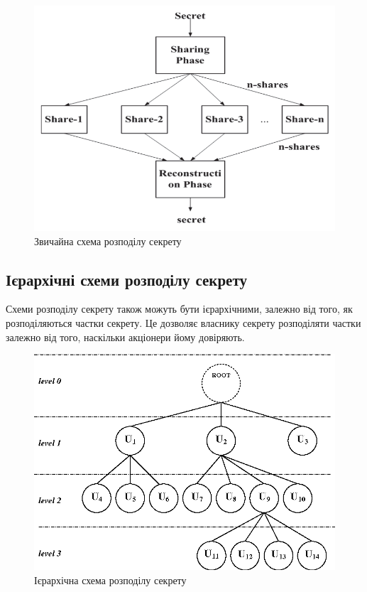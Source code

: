 \begin{figure}[ht]
        \centering
        \includegraphics[scale=0.37]{IMAGES/SSscheme.png}
        \caption{Звичайна схема розподілу секрету}
        \label{fig_SSscheme}
\end{figure}
\vspace{-1cm}

\subsection{Ієрархічні схеми розподілу секрету}
Схеми розподілу секрету також можуть бути ієрархічними, залежно від того, як розподіляються частки секрету. Це дозволяє власнику секрету розподіляти частки залежно від того, наскільки акціонери йому довіряють.

\begin{figure}[ht]
        \centering
        \includegraphics[scale=0.37]{IMAGES/hierarchical_SCscheme.png}
        \caption{Ієрархічна схема розподілу секрету}
        \label{fig_hierSSscheme}
\end{figure}

